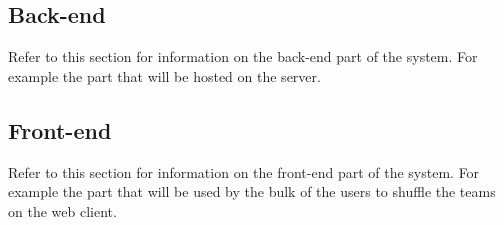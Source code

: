 \subsection{Back-end}
	Refer to this section for information on the back-end part of the system. For example the part that will be hosted on the server.\par
	\vspace{0.3cm}
	

\subsection{Front-end}
	Refer to this section for information on the front-end part of the system. For example the part that will be used by the bulk of the users to shuffle the teams on the web client.\par
	\vspace{0.3cm}
	